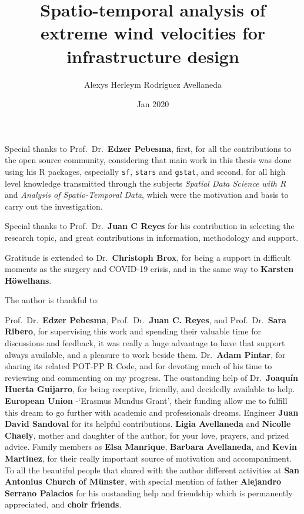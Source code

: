 \documentclass[12pt,oneside]{reedthesis}
\title{Spatio-temporal analysis of extreme wind velocities for infrastructure design}
\author{Alexys Herleym Rodríguez Avellaneda}
\date{Jan 2020}
\begin{document}
  \maketitle

\frontmatter %
\pagestyle{empty} %
  \begin{acknowledgements}
    Special thanks to Prof.~Dr.~\textbf{Edzer Pebesma}, first, for all the contributions to the open source community, considering that main work in this thesis was done using his R packages, especially \texttt{sf}, \texttt{stars} and \texttt{gstat}, and second, for all high level knowledge transmitted through the subjects \emph{Spatial Data Science with R} and \emph{Analysis of Spatio-Temporal Data}, which were the motivation and basis to carry out the investigation.
    
    \par
    
    Special thanks to Prof.~Dr.~\textbf{Juan C Reyes} for his contribution in selecting the research topic, and great contributions in information, methodology and support.
    
    \par
    
    Gratitude is extended to Dr.~\textbf{Christoph Brox}, for being a support in difficult moments as the surgery and COVID-19 crisis, and in the same way to \textbf{Karsten Höwelhans}.
    
    \par
    
    The author is thankful to:
    
    \par
    
    Prof.~Dr.~\textbf{Edzer Pebesma}, Prof.~Dr.~\textbf{Juan C. Reyes}, and Prof.~Dr.~\textbf{Sara Ribero}, for supervising this work and spending their valuable time for discussions and feedback, it was really a huge advantage to have that support always available, and a pleasure to work beside them. Dr.~\textbf{Adam Pintar}, for sharing its related POT-PP R Code, and for devoting much of his time to reviewing and commenting on my progress. The oustanding help of Dr.~\textbf{Joaquín Huerta Guijarro}, for being receptive, friendly, and decidedly available to help. \textbf{European Union} -`Erasmus Mundus Grant', their funding allow me to fulfill this dream to go further with academic and professionals dreams. Engineer \textbf{Juan David Sandoval} for its helpful contributions. \textbf{Ligia Avellaneda} and \textbf{Nicolle Chaely}, mother and daughter of the author, for your love, prayers, and prized advice. Family members as \textbf{Elsa Manrique}, \textbf{Barbara Avellaneda}, and \textbf{Kevin Martinez}, for their really important source of motivation and accompaniment. To all the beautiful people that shared with the author different activities at \textbf{San Antonius Church of Münster}, with special mention of father \textbf{Alejandro Serrano Palacios} for his oustanding help and friendship which is permanently appreciated, and \textbf{choir friends}.
  \end{acknowledgements}
\end{document}
